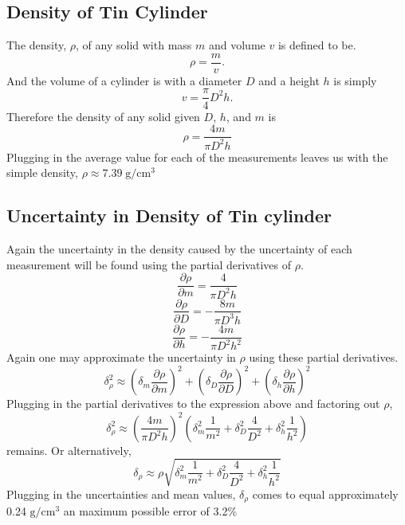 \documentclass[11pt]{article}
\begin{document}
\subsection{Density of Tin Cylinder}
The density, \(\rho\), of any solid with mass \(m\) and volume \(v\) is defined to be.
\begin{equation}
\rho = \frac{m}{v}.
\end{equation}
And the volume of a cylinder is with a diameter \(D\) and a height \(h\) is simply
\begin{equation}
v = \frac{\pi }{4}D^2 h.
\end{equation}
Therefore the density of any solid given \(D\), \(h\), and \(m\) is 
\begin{equation}
\rho = \frac{4 m}{\pi D^2 h }
\end{equation}
Plugging in the average value for each of the measurements leaves us with the simple density, \( \rho \approx  7.39 \; \textrm{g} / \textrm{cm}^3 \)
\subsection{Uncertainty in Density of Tin cylinder}
Again the uncertainty in the density caused by the uncertainty of each measurement will be found using the partial derivatives of \(\rho\).
\begin{equation}
\frac{\partial \rho}{\partial m} = \frac{4}{\pi D^2 h}
\end{equation}
\begin{equation}
\frac{\partial \rho}{\partial D} = -\frac{8m}{\pi D^3 h}
\end{equation}
\begin{equation}
\frac{\partial \rho}{\partial h} = -\frac{4m}{\pi D^2 h^2}
\end{equation}
Again one may approximate the uncertainty in \(\rho\) using these partial derivatives.
\begin{equation}
\delta_\rho^2 \approx \left(\delta_{m} \frac{\partial \rho}{\partial m}\right)^2 + \left(\delta_{D} \frac{\partial \rho}{\partial D}\right)^2 + \left(\delta_{h} \frac{\partial \rho}{\partial h}\right)^2
\end{equation}
Plugging in the partial derivatives to the expression above and factoring out \( \rho \),
\begin{equation}
\delta_\rho^2 \approx \left(\frac{4m}{\pi D^2 h}\right)^2 \left(\delta^2_m \frac{1}{m^2} + \delta^2_D \frac{4}{D^2} + \delta^2_h \frac{1}{h^2} \right)
\end{equation}
remains. Or alternatively,
\begin{equation}
\delta_\rho \approx \rho \sqrt{\delta^2_m \frac{1}{m^2} + \delta^2_D \frac{4}{D^2} + \delta^2_h \frac{1}{h^2} }	
\end{equation}
Plugging in the uncertainties and mean values, \(\delta_\rho\) comes to equal approximately 0.24 \( \mathrm{g}/\mathrm{cm}^3 \) an maximum possible error of 3.2\%
\end{document}
